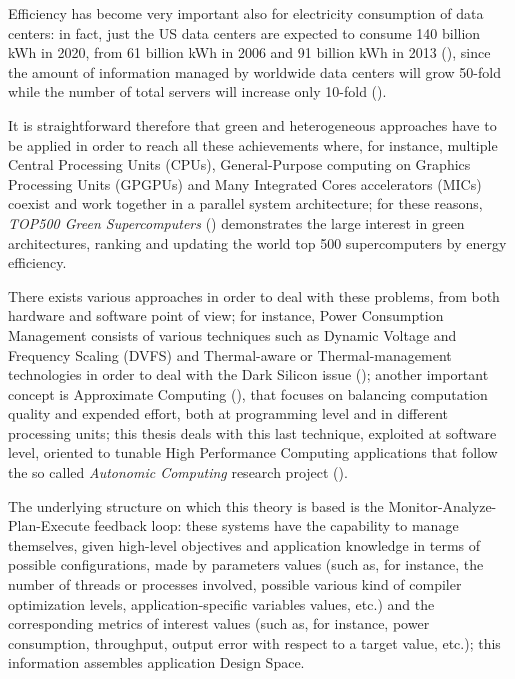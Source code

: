 Efficiency has become very important also for electricity consumption of data centers: in fact, just the US data centers are expected to consume 140 billion kWh in 2020, from 61 billion kWh in 2006 and 91 billion kWh in 2013 (\cite{site:NRDC2015}), since the amount of information managed by worldwide data centers will grow 50-fold while the number of total servers will increase only 10-fold (\cite{gantz2011extracting}).

It is straightforward therefore that green and heterogeneous approaches have to be applied in order to reach all these achievements where, for instance, multiple Central Processing Units (CPUs), General-Purpose computing on Graphics Processing Units (GPGPUs) and Many Integrated Cores accelerators (MICs) coexist and work together in a parallel system architecture; for these reasons, \textit{TOP500 Green Supercomputers} (\cite{site:topGreen500}) demonstrates the large interest in green architectures, ranking and updating the world top 500 supercomputers by energy efficiency.

There exists various approaches in order to deal with these problems, from both hardware and software point of view; for instance, Power Consumption Management consists of various techniques such as Dynamic Voltage and Frequency Scaling (DVFS) and Thermal-aware or Thermal-management technologies in order to deal with the Dark Silicon issue (\cite{mittal2014power}); another important concept is Approximate Computing (\cite{mittal2016survey}), that focuses on balancing computation quality and expended effort, both at programming level and in different processing units; this thesis deals with this last technique, exploited at software level, oriented to tunable High Performance Computing applications that follow the so called \textit{Autonomic Computing} research project (\cite{kephart2003vision}).

The underlying structure on which this theory is based is the Monitor-Analyze-Plan-Execute feedback loop: these systems have the capability to manage themselves, given high-level objectives and application knowledge in terms of possible configurations, made by parameters values (such as, for instance, the number of threads or processes involved, possible various kind of compiler optimization levels, application-specific variables values, etc.) and the corresponding metrics of interest values (such as, for instance, power consumption, throughput, output error with respect to a target value, etc.); this information assembles application Design Space.

